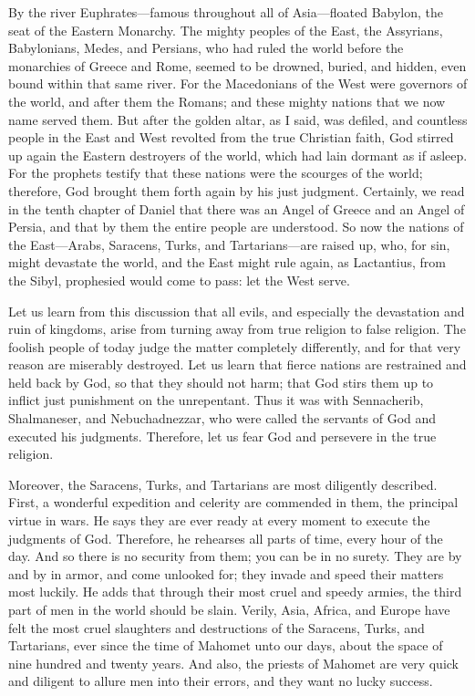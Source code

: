 By the river Euphrates—famous throughout all of Asia—floated Babylon, the seat of the Eastern Monarchy. The mighty peoples of the East, the Assyrians, Babylonians, Medes, and Persians, who had ruled the world before the monarchies of Greece and Rome, seemed to be drowned, buried, and hidden, even bound within that same river. For the Macedonians of the West were governors of the world, and after them the Romans; and these mighty nations that we now name served them. But after the golden altar, as I said, was defiled, and countless people in the East and West revolted from the true Christian faith, God stirred up again the Eastern destroyers of the world, which had lain dormant as if asleep. For the prophets testify that these nations were the scourges of the world; therefore, God brought them forth again by his just judgment. Certainly, we read in the tenth chapter of Daniel that there was an Angel of Greece and an Angel of Persia, and that by them the entire people are understood. So now the nations of the East—Arabs, Saracens, Turks, and Tartarians—are raised up, who, for sin, might devastate the world, and the East might rule again, as Lactantius, from the Sibyl, prophesied would come to pass: let the West serve.

Let us learn from this discussion that all evils, and especially the devastation and ruin of kingdoms, arise from turning away from true religion to false religion. The foolish people of today judge the matter completely differently, and for that very reason are miserably destroyed. Let us learn that fierce nations are restrained and held back by God, so that they should not harm; that God stirs them up to inflict just punishment on the unrepentant. Thus it was with Sennacherib, Shalmaneser, and Nebuchadnezzar, who were called the servants of God and executed his judgments. Therefore, let us fear God and persevere in the true religion.

Moreover, the Saracens, Turks, and Tartarians are most diligently described. First, a wonderful expedition and celerity are commended in them, the principal virtue in wars. He says they are ever ready at every moment to execute the judgments of God. Therefore, he rehearses all parts of time, every hour of the day. And so there is no security from them; you can be in no surety. They are by and by in armor, and come unlooked for; they invade and speed their matters most luckily. He adds that through their most cruel and speedy armies, the third part of men in the world should be slain. Verily, Asia, Africa, and Europe have felt the most cruel slaughters and destructions of the Saracens, Turks, and Tartarians, ever since the time of Mahomet unto our days, about the space of nine hundred and twenty years. And also, the priests of Mahomet are very quick and diligent to allure men into their errors, and they want no lucky success.

